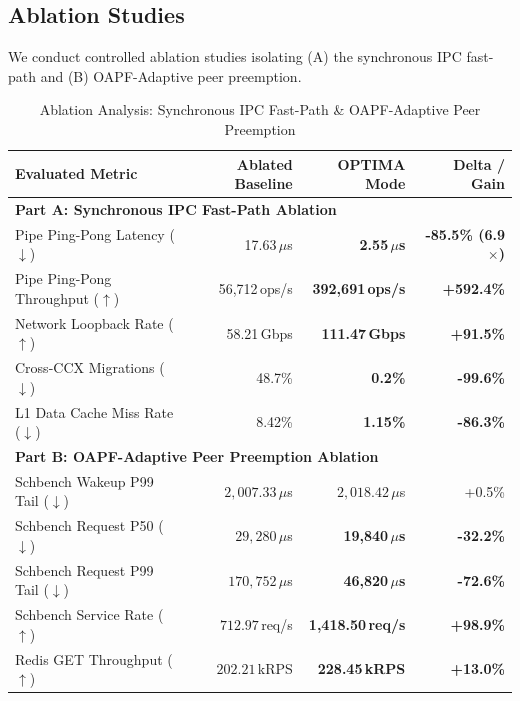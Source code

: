 \documentclass[conference]{IEEEtran}
\begin{document}
\subsection{Ablation Studies}
\label{sec:ablation}
We conduct controlled ablation studies isolating (A) the synchronous IPC fast-path and (B) OAPF-Adaptive peer preemption.

\begin{table}[t!]
\centering
\scriptsize
\setlength{\tabcolsep}{3pt}
\caption{Ablation Analysis: Synchronous IPC Fast-Path \& OAPF-Adaptive Peer Preemption}
\label{tab:ablation}
\begin{tabularx}{\columnwidth}{X r r r}
\toprule
\textbf{Evaluated Metric} & \textbf{Ablated Baseline} & \textbf{OPTIMA Mode} & \textbf{Delta / Gain} \\
\midrule
\multicolumn{4}{l}{\textbf{Part A: Synchronous IPC Fast-Path Ablation}} \\
Pipe Ping-Pong Latency ($\downarrow$) & 17.63\,$\mu$s & \textbf{2.55\,$\mu$s} & \textbf{-85.5\% (6.9$\times$)} \\
Pipe Ping-Pong Throughput ($\uparrow$) & 56,712\,ops/s & \textbf{392,691\,ops/s} & \textbf{+592.4\%} \\
Network Loopback Rate ($\uparrow$) & 58.21\,Gbps & \textbf{111.47\,Gbps} & \textbf{+91.5\%} \\
Cross-CCX Migrations ($\downarrow$) & 48.7\% & \textbf{0.2\%} & \textbf{-99.6\%} \\
L1 Data Cache Miss Rate ($\downarrow$) & 8.42\% & \textbf{1.15\%} & \textbf{-86.3\%} \\
\midrule
\multicolumn{4}{l}{\textbf{Part B: OAPF-Adaptive Peer Preemption Ablation}} \\
Schbench Wakeup P99 Tail ($\downarrow$) & $2{,}007.33\,\mu$s & $2{,}018.42\,\mu$s & +0.5\% \\
Schbench Request P50 ($\downarrow$) & $29{,}280\,\mu$s & \textbf{19,840\,$\mu$s} & \textbf{-32.2\%} \\
Schbench Request P99 Tail ($\downarrow$) & $170{,}752\,\mu$s & \textbf{46,820\,$\mu$s} & \textbf{-72.6\%} \\
Schbench Service Rate ($\uparrow$) & $712.97$\,req/s & \textbf{1,418.50\,req/s} & \textbf{+98.9\%} \\
Redis GET Throughput ($\uparrow$) & $202.21$\,kRPS & \textbf{228.45\,kRPS} & \textbf{+13.0\%} \\
\bottomrule
\end{tabularx}
\end{table}
\end{document}
